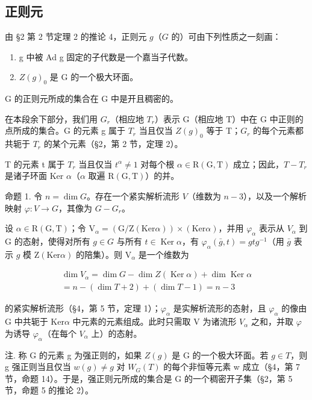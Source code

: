 \subsection{正则元}

由 §2 第 2 节定理 2 的推论 4，正则元 \(g\)（\(G\) 的）可由下列性质之一刻画：

\begin{enumerate}
\def\labelenumi{\alph{enumi})}
\item
  g 中被 Ad g 固定的子代数是一个嘉当子代数。
\item
  \(Z(g)_{0}\) 是 G 的一个极大环面。
\end{enumerate}

\(\mathrm{G}\) 的正则元所成的集合在 \(\mathrm{G}\) 中是开且稠密的。

在本段余下部分，我们用 \(G_{r}\)（相应地 \(T_{r}\)）表示 G（相应地 T）中在 G 中正则的点所成的集合。G 的元素 g 属于 \(T_{r}\) 当且仅当 \(Z(g)_{0}\) 等于 T；\(G_{r}\) 的每个元素都共轭于 \(T_{r}\) 的某个元素（§2，第 2 节，定理 2）。

T 的元素 t 属于 \(T_{r}\) 当且仅当 \(t^{\alpha} \neq 1\) 对每个根 \(\alpha \in \mathrm{R}(\mathrm{G}, \mathrm{T})\) 成立；因此，\(T - T_{r}\) 是诸子环面 Ker \(\alpha\)（\(\alpha\) 取遍 \(\mathrm{R}(\mathrm{G}, \mathrm{T})\)）的并。

命题 1. 令 \(n = \dim G\)。存在一个紧实解析流形 \(V\)（维数为 \(n - 3\)），以及一个解析映射 \(\varphi : V \to G\)，其像为 \(G - G_r\)。

设 \(\alpha\in\mathrm{R}(\mathrm{G},\mathrm{T})\)；令 \(\mathrm{V}_{\alpha}=(\mathrm{G}/\mathrm{Z}(\mathrm{Ker}\alpha))\times(\mathrm{Ker}\alpha)\)，并用 \(\varphi_{\alpha}\) 表示从 \(V_{\alpha}\) 到 G 的态射，使得对所有 \(g\in G\) 与所有 \(t\in\operatorname{Ker}\alpha\)，有 \(\varphi_{\alpha}(\bar{g},t) = gtg^{-1}\)（用 \(\bar{g}\) 表示 \(g\) 模 \(\mathrm{Z}(\mathrm{Ker}\alpha)\) 的陪集）。则 \(\mathrm{V}_{\alpha}\) 是一个维数为

\[
\begin{array}{c} \dim V _ {\alpha} = \dim G - \dim Z (\operatorname{Ker} \alpha) + \dim \operatorname{Ker} \alpha \\ = n - (\dim T + 2) + (\dim T - 1) = n - 3 \end{array}
\]

的紧实解析流形（§4，第 5 节，定理 1）；\(\varphi_{\alpha}\) 是实解析流形的态射，且 \(\varphi_{\alpha}\) 的像由 G 中共轭于 \(\mathrm{Ker} \alpha\) 中元素的元素组成。此时只需取 V 为诸流形 \(V_{\alpha}\) 之和，并取 \(\varphi\) 为诱导 \(\varphi_{\alpha}\)（在每个 \(V_{\alpha}\) 上）的态射。

注. 称 G 的元素 g 为强正则的，如果 \(Z(g)\) 是 G 的一个极大环面。若 \(g \in T\)，则 g 强正则当且仅当 \(w(g) \neq g\) 对 \(W_{G}(T)\) 的每个非恒等元素 w 成立（§4，第 7 节，命题 14）。于是，强正则元所成的集合是 G 的一个稠密开子集（§2，第 5 节，命题 5 的推论 2）。


